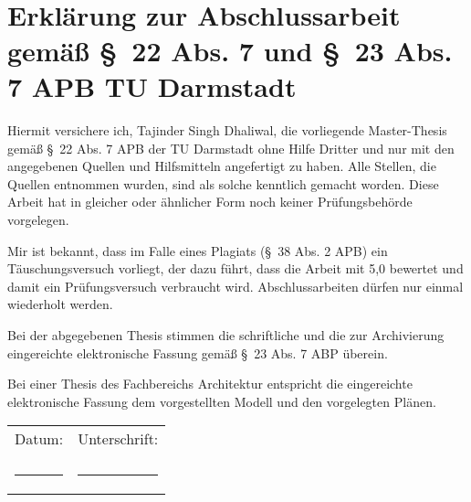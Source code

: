 \ \\[3cm]	%

\section*{Erkl\"arung zur Abschlussarbeit gem\"aß \S\ 22 Abs. 7 und \S\ 23 Abs. 7 APB TU Darmstadt}
\noindent
Hiermit versichere ich, Tajinder Singh Dhaliwal, die vorliegende Master-Thesis gem\"aß \S\ 22 Abs. 7 APB der TU Darmstadt ohne Hilfe Dritter und nur mit den angegebenen Quellen und Hilfsmitteln angefertigt zu haben. Alle Stellen, die Quellen entnommen wurden, sind als solche kenntlich gemacht worden. Diese Arbeit hat in gleicher oder \"ahnlicher  Form noch keiner Pr\"ufungsbeh\"orde  vorgelegen. 

Mir ist bekannt, dass im Falle eines Plagiats (\S\ 38 Abs. 2 APB) ein T\"auschungsversuch vorliegt, der dazu f\"uhrt, dass die Arbeit mit 5,0 bewertet und damit ein Pr\"ufungsversuch verbraucht wird. Abschlussarbeiten d\"urfen nur einmal wiederholt werden.

Bei der abgegebenen Thesis stimmen die schriftliche und die zur Archivierung eingereichte elektronische Fassung gem\"aß \S\ 23 Abs. 7 ABP \"uberein.

Bei einer Thesis des Fachbereichs Architektur entspricht die eingereichte elektronische Fassung dem vorgestellten Modell und den vorgelegten Pl\"anen.
\vspace*{20mm} \\
\noindent
\begin{tabular}{ll}
	Datum: & Unterschrift: \\
	 & \\
	\rule{0.3\textwidth}{0.4pt}	& \rule{0.4\textwidth}{0.4pt}\\
\end{tabular}
	
\vspace{40mm}
\noindent


